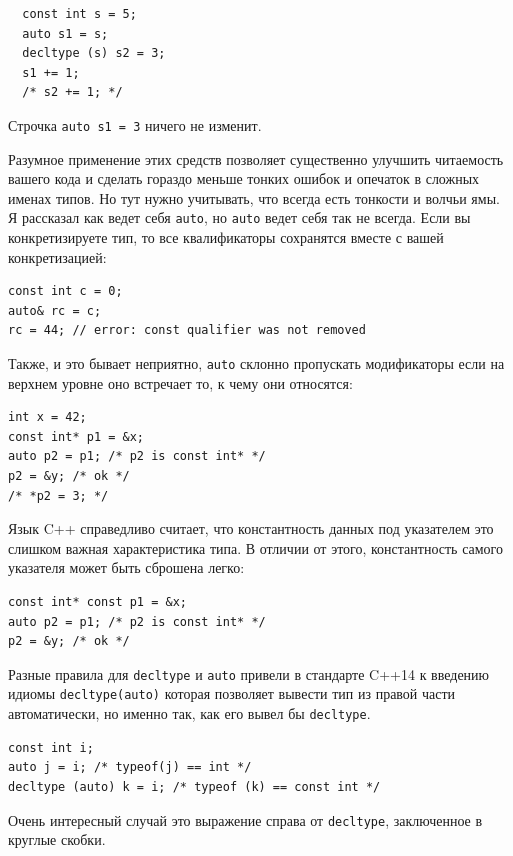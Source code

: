 \documentclass[a4paper,12pt,oneside]{book}
\begin{document}
\begin{lstlisting}
  const int s = 5;
  auto s1 = s;
  decltype (s) s2 = 3;
  s1 += 1;
  /* s2 += 1; */
\end{lstlisting}

Строчка \lstinline!auto s1 = 3! ничего не изменит.

Разумное применение этих средств позволяет существенно улучшить читаемость вашего кода и сделать гораздо меньше тонких ошибок и опечаток в сложных именах типов. Но тут нужно учитывать, что всегда есть тонкости и волчьи ямы. Я рассказал как ведет себя \lstinline!auto!, но \lstinline!auto! ведет себя так не всегда. Если вы конкретизируете тип, то все квалификаторы сохранятся вместе с вашей конкретизацией:

\begin{lstlisting}
const int c = 0;
auto& rc = c;
rc = 44; // error: const qualifier was not removed
\end{lstlisting}

Также, и это бывает неприятно, \lstinline!auto! склонно пропускать модификаторы если на верхнем уровне оно встречает то, к чему они относятся:

\begin{lstlisting}
int x = 42;
const int* p1 = &x;
auto p2 = p1; /* p2 is const int* */
p2 = &y; /* ok */
/* *p2 = 3; */
\end{lstlisting}

Язык C++ справедливо считает, что константность данных под указателем это слишком важная характеристика типа. В отличии от этого, константность самого указателя может быть сброшена легко:

\begin{lstlisting}
const int* const p1 = &x;
auto p2 = p1; /* p2 is const int* */
p2 = &y; /* ok */
\end{lstlisting}

Разные правила для \lstinline!decltype! и \lstinline!auto! привели в стандарте C++14 к введению идиомы \lstinline!decltype(auto)! которая позволяет вывести тип из правой части автоматически, но именно так, как его вывел бы \lstinline!decltype!.

\begin{lstlisting}
const int i;
auto j = i; /* typeof(j) == int */
decltype (auto) k = i; /* typeof (k) == const int */
\end{lstlisting}

Очень интересный случай это выражение справа от \lstinline!decltype!, заключенное в круглые скобки.
\end{document}

